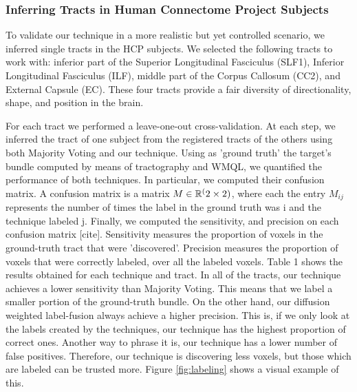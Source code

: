 
\subsubsection{Inferring Tracts in Human Connectome Project Subjects}
To validate our technique in a more realistic but yet controlled scenario, we
inferred single tracts in the HCP subjects. We selected the following tracts to
work with: inferior part of the Superior Longitudinal Fasciculus (SLF1),
Inferior Longitudinal Fasciculus (ILF), middle part of the
Corpus Callosum (CC2), and External Capsule (EC). These four tracts provide
a fair diversity of directionality, shape, and position in the brain.

For each tract we performed a leave-one-out cross-validation. At each step, we
inferred the tract of one subject from the registered tracts of the others
using both Majority Voting and our technique. Using as 'ground truth' the
target's bundle computed by means of tractography and WMQL, we quantified the
performance of both techniques. In particular, we computed their confusion matrix.
A confusion matrix is a matrix $M \in \mathbb{R}^(2\times2)$, where each the entry $M_{ij}$
represents the number of times the label in the ground truth was i and the
technique labeled j. Finally, we computed the sensitivity, and precision on
each confusion matrix [cite]. Sensitivity measures the proportion of voxels
in the ground-truth tract that were 'discovered'. Precision measures the proportion
of voxels that were correctly labeled, over all the labeled voxels. Table 1 shows
the results obtained for each technique and tract. In all of the tracts, our
technique achieves a lower sensitivity than Majority Voting. This means that
we label a smaller portion of the ground-truth bundle. On the other hand,
our diffusion weighted label-fusion always achieve a higher precision. This
is, if we only look at the labels created by the techniques, our technique
has the highest proportion of correct ones. Another way to phrase it is, our
technique has a lower number of false positives.
Therefore, our technique is discovering less voxels, but those which are labeled
can be trusted more. Figure \ref{fig:labeling} shows a visual example of this.

